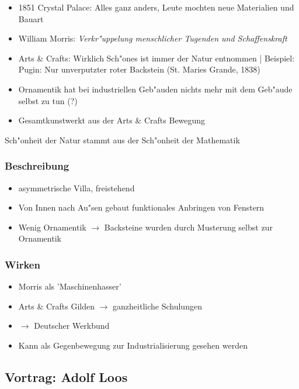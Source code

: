 \documentclass[a5paper]{scrartcl}
\begin{document}
\begin{itemize}
  \item 1851 Crystal Palace: Alles ganz anders, Leute mochten neue Materialien und Bauart
  \item William Morris: \emph{Verkr"uppelung menschlicher Tugenden und Schaffenskraft}
  \item Arts \& Crafts: Wirklich Sch"ones ist immer der Natur entnommen | Beispiel: Pugin: Nur unverputzter roter Backstein (St. Maries Grande, 1838)
  \item Ornamentik hat bei industriellen Geb"auden nichts mehr mit dem Geb"aude selbst zu tun (?)
  \item Gesamtkunstwerkt aus der Arts \& Crafts Bewegung

\end{itemize}

Sch"onheit der Natur stammt aus der Sch"onheit der Mathematik

\subsubsection{Beschreibung}

\begin{itemize}
  \item asymmetrische Villa, freistehend
  \item Von Innen nach Au"sen gebaut funktionales Anbringen von Fenstern
  \item Wenig Ornamentik $\rightarrow$ Backsteine wurden durch Musterung selbst zur Ornamentik
\end{itemize}


\subsubsection{Wirken}

\begin{itemize}
  \item Morris als 'Maschinenhasser'
  \item Arts \& Crafts Gilden $\rightarrow$  ganzheitliche Schulungen
  \item $\rightarrow$ Deutscher Werkbund
  \item Kann als Gegenbewegung zur Industrialisierung gesehen werden
\end{itemize}

\subsection{Vortrag: Adolf Loos}
\end{document}
